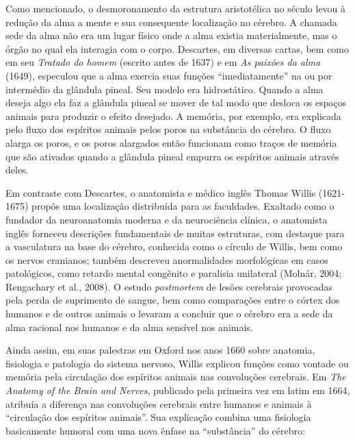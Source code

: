 Como mencionado, o desmoronamento da estrutura aristotélica no século
 levou à redução da alma a mente e sua consequente localização no
cérebro. A chamada sede da alma não era um lugar físico onde a alma
existia materialmente, mas o órgão no qual ela interagia com o corpo.
Descartes, em diversas cartas, bem como em seu \emph{Tratado do homem}
(escrito antes de 1637) e em \emph{As paixões da alma} (1649), especulou
que a alma exercia suas funções ``imediatamente'' na ou por intermédio
da glândula pineal. Seu modelo era hidrostático. Quando a alma deseja
algo ela faz a glândula pineal se mover de tal modo que desloca os
espaços animais para produzir o efeito desejado. A memória, por exemplo,
era explicada pelo fluxo dos espíritos animais pelos poros na substância
do cérebro. O fluxo alarga os poros, e os poros alargados então
funcionam como traços de memória que são ativados quando a glândula
pineal empurra os espíritos animais através deles.

Em contraste com Descartes, o anatomista e médico inglês Thomas Willis
(1621-1675) propôs uma localização distribuída para as faculdades.
Exaltado como o fundador da neuroanatomia moderna e da neurociência
clínica, o anatomista inglês forneceu descrições fundamentais de muitas
estruturas, com destaque para a vasculatura na base do cérebro,
conhecida como o círculo de Willis, bem como os nervos cranianos; também
descreveu anormalidades morfológicas em casos patológicos, como retardo
mental congênito e paralisia unilateral (Molnár, 2004; Rengachary et
al., 2008). O estudo \emph{postmortem} de lesões cerebrais provocadas
pela perda de suprimento de sangue, bem como comparações entre o córtex
dos humanos e de outros animais o levaram a concluir que o cérebro era a
sede da alma racional nos humanos e da alma sensível nos animais.

Ainda assim, em suas palestras em Oxford nos anos 1660 sobre anatomia,
fisiologia e patologia do sistema nervoso, Willis explicou funções como
vontade ou memória pela circulação dos espíritos animais nas convoluções
cerebrais. Em \emph{The Anatomy of the Brain and Nerves}, publicado pela
primeira vez em latim em 1664, atribuía a diferença nas convoluções
cerebrais entre humanos e animais à ``circulação dos espíritos
animais''. Sua explicação combina uma fisiologia basicamente humoral com
uma nova ênfase na ``substância'' do cérebro:

